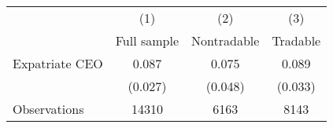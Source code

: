 \begin{tabular}{l*{3}{c}}
\hline\hline
                    &\multicolumn{1}{c}{(1)}&\multicolumn{1}{c}{(2)}&\multicolumn{1}{c}{(3)}\\
                    &\multicolumn{1}{c}{Full sample}&\multicolumn{1}{c}{Nontradable}&\multicolumn{1}{c}{Tradable}\\
\hline
Expatriate CEO      &       0.087&       0.075&       0.089\\
                    &     (0.027)&     (0.048)&     (0.033)\\
\hline
Observations        &       14310&        6163&        8143\\
\hline\hline
\end{tabular}
